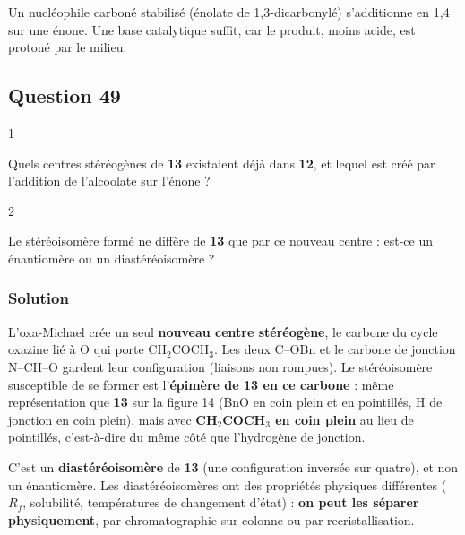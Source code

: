 \documentclass[11pt,a4paper]{article}
\begin{document}
\begin{methode}

Un nucléophile carboné stabilisé (énolate de 1,3-dicarbonylé) s'additionne en 1,4 sur une énone. Une base catalytique suffit, car le produit, moins acide, est protoné par le milieu.

\end{methode}

\hypertarget{question-49}{%
\subsection{Question 49}\label{question-49}}

\begin{indication}{1}

Quels centres stéréogènes de \textbf{13} existaient déjà dans \textbf{12}, et lequel est créé par l'addition de l'alcoolate sur l'énone ?

\end{indication}

\begin{indication}{2}

Le stéréoisomère formé ne diffère de \textbf{13} que par ce nouveau centre : est-ce un énantiomère ou un diastéréoisomère ?

\end{indication}

\hypertarget{solution-48}{%
\subsubsection{Solution}\label{solution-48}}

L'oxa-Michael crée un seul \textbf{nouveau centre stéréogène}, le carbone du cycle oxazine lié à O qui porte CH\(_2\)COCH\(_3\). Les deux C--OBn et le carbone de jonction N--CH--O gardent leur configuration (liaisons non rompues). Le stéréoisomère susceptible de se former est l'\textbf{épimère de 13 en ce carbone} : même représentation que \textbf{13} sur la figure 14 (BnO en coin plein et en pointillés, H de jonction en coin plein), mais avec \textbf{CH\(_2\)COCH\(_3\) en coin plein} au lieu de pointillés, c'est-à-dire du même côté que l'hydrogène de jonction.

C'est un \textbf{diastéréoisomère} de \textbf{13} (une configuration inversée sur quatre), et non un énantiomère. Les diastéréoisomères ont des propriétés physiques différentes (\(R_f\), solubilité, températures de changement d'état) : \textbf{on peut les séparer physiquement}, par chromatographie sur colonne ou par recristallisation.
\end{document}
